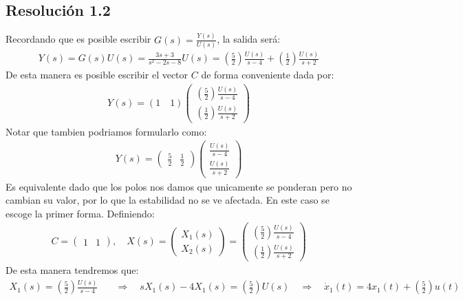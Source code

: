 \documentclass[
  11pt,
  letterpaper,
   addpoints,
  answers
  ]{exam}
\begin{document}
\begin{questions}
\begin{solution}
  \subsection*{Resolución 1.2}
Recordando que es posible escribir $G(s)= \frac{Y(s)}{U(s)}$, la salida será:
\begin{align}
      Y(s) = G(s)U(s) = \frac{3s+3}{s^{2}-2s-8}U(s) = \left(\frac{5}{2}\right)\frac{U(s)}{s-4} + \left(\frac{1}{2}\right)\frac{U(s)}{s+2}
\end{align}
De esta manera es posible escribir el vector $C$ de forma conveniente dada por:
\begin{align}
  Y(s) = (1 \quad 1) \begin{pmatrix} \left(\frac{5}{2}\right)\frac{U(s)}{s-4} \\ \left(\frac{1}{2}\right)\frac{U(s)}{s+2} \end{pmatrix}
\end{align}
Notar que tambien podriamos formularlo como:
\begin{align}
  Y(s) = \begin{pmatrix} \frac{5}{2} & \frac{1}{2}\end{pmatrix} \begin{pmatrix} \frac{U(s)}{s-4} \\ \frac{U(s)}{s+2} \end{pmatrix}
\end{align}
Es equivalente dado que los polos nos damos que unicamente se ponderan pero no cambian su valor, por lo que la estabilidad no se ve afectada. En este caso se escoge la primer forma. Definiendo:
\begin{align}
  C= \begin{pmatrix} 1 & 1 \end{pmatrix}, \quad X(s) = \begin{pmatrix} X_1(s) \\ X_2(s) \end{pmatrix} = \begin{pmatrix} \left(\frac{5}{2}\right)\frac{U(s)}{s-4} \\ \left(\frac{1}{2}\right)\frac{U(s)}{s+2} \end{pmatrix}
\end{align}
De esta manera tendremos que:
\begin{align}
  X_1(s) = \left(\frac{5}{2}\right)\frac{U(s)}{s-4} \quad &\Longrightarrow \quad sX_1(s) - 4X_1(s) = \left(\frac{5}{2}\right)U(s) \quad \Longrightarrow \quad \dot{x}_1(t) = 4x_1(t) + \left(\frac{5}{2}\right)u(t) \\

\end{align}
\end{solution}
\end{questions}
\end{document}
